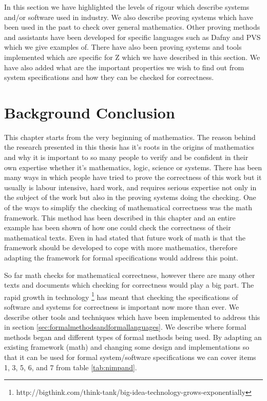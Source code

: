 In this section we have highlighted the levels of rigour which describe systems
and/or software used in industry. We also describe proving systems which have
been used in the past to check over general mathematics. Other proving methods
and assistants have been developed for specific languages such as Dafny and PVS
which we give examples of. There have also been proving systems and tools
implemented which are specific for Z which we have described in this section. We
have also added what are the important properties we wish to find out from
system specifications and how they can be checked for correctness.

\section{Background Conclusion}

This chapter starts from the very beginning of mathematics. The reason behind
the research presented in this thesis has it's roots in the origins of
mathematics and why it is important to so many people to verify and be confident
in their own expertise whether it's mathematics, logic, science or systems.
There has been many ways in which people have tried to prove the correctness of
this work but it usually is labour intensive, hard work, and requires serious
expertise not only in the subject of the work but also in the proving systems
doing the checking. One of the ways to simplify the checking of mathematical
correctness was the \gls{math} framework. This method has been described in this
chapter and an entire example has been shown of how one could check the
correctness of their mathematical texts. Even in \cite{lamarphd} had stated
that future work of \gls{math} is that the framework should be developed to cope
with more mathematics, therefore adapting the framework for formal
specifications would address this point.

So far \gls{math} checks for mathematical correctness, however there are many
other texts and documents which checking for correctness would play a big part.
The rapid growth in technology
\footnote{http://bigthink.com/think-tank/big-idea-technology-grows-exponentially}
has meant that checking the specifications of software and systems for
correctness is important now more than ever. We describe other tools and
techniques which have been implemented to address this in section
\ref{sec:formalmethodsandformallanguages}.  We describe where formal methods
began and different types of formal methods being used. By adapting an existing
framework (\gls{math}) and changing some design and implementations so that it
can be used for formal system/software specifications we can cover items 1, 3,
5, 6, and 7 from table \ref{tab:nimpand}.

